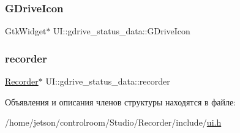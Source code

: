 \subsubsection{\texorpdfstring{G\+Drive\+Icon}{GDriveIcon}}
{\footnotesize\ttfamily Gtk\+Widget$\ast$ U\+I\+::gdrive\+\_\+status\+\_\+data\+::\+G\+Drive\+Icon}

\mbox{\label{struct_u_i_1_1gdrive__status__data_a8634b4af863a719fe24b39b88ab103a9}} 
\subsubsection{\texorpdfstring{recorder}{recorder}}
{\footnotesize\ttfamily \hyperlink{class_recorder}{Recorder}$\ast$ U\+I\+::gdrive\+\_\+status\+\_\+data\+::recorder}



Объявления и описания членов структуры находятся в файле\+:\begin{DoxyCompactItemize}
\item 
/home/jetson/controlroom/\+Studio/\+Recorder/include/\hyperlink{_recorder_2include_2ui_8h}{ui.\+h}\end{DoxyCompactItemize}
